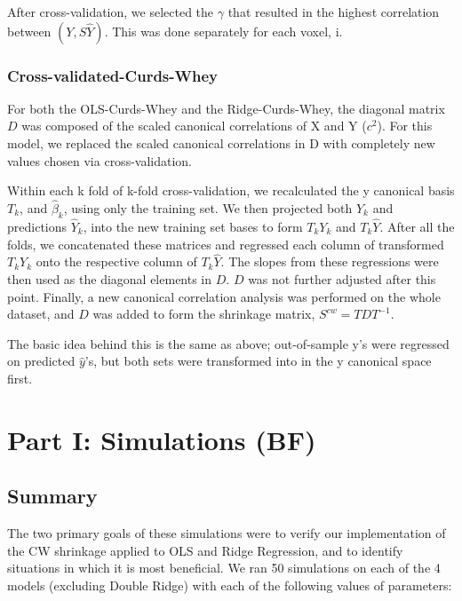 \documentclass{article}
\begin{document}
After cross-validation, we selected the $ \gamma $ that resulted in
the highest correlation between $ (Y , S \hat Y) $. This was done
separately for each voxel, i.

\subsubsection{Cross-validated-Curds-Whey}

For both the OLS-Curds-Whey and the Ridge-Curds-Whey, the diagonal matrix $D$ was composed of the scaled canonical correlations of X and Y ($ c^2 $). For this model, we replaced the scaled canonical correlations in D with completely new values chosen via cross-validation. 

Within each k fold of k-fold cross-validation, we recalculated the y canonical basis $T_k$, and $
\hat \beta_k$, using only the training set. We then projected both $Y_k$ and predictions $\hat Y_k$, into the new training set bases to form $T_k Y_k$ and $T_k \hat Y $. After all the folds, we concatenated these matrices and regressed each column of transformed $T_k Y_k$ onto the respective column of $T_k \hat Y $. The slopes from these regressions were then used as the diagonal elements in $D$. $D$ was not further adjusted after this point. Finally, a new canonical correlation analysis was performed on the whole dataset, and $ D $ was added to form the shrinkage matrix, $ S^{cw} = T D T^{-1} $. 

The basic idea behind this is the same as above; out-of-sample y's were regressed on predicted $\hat y$'s, but both sets were transformed into in the y canonical space first. 






\section{Part I: Simulations (BF)}\label{part-i-simulations-bf}

\subsection{Summary}

The two primary goals of these simulations were to verify our
implementation of the CW shrinkage applied to OLS and Ridge Regression,
and to identify situations in which it is most beneficial. We ran 50
simulations on each of the 4 models (excluding Double Ridge) with each
of the following values of parameters:
\end{document}
